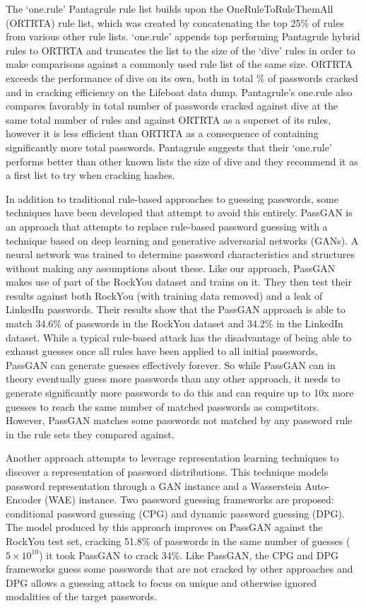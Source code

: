 \documentclass{article}
\begin{document}
The `one.rule' Pantagrule rule list builds upon the OneRuleToRuleThemAll
(ORTRTA) rule list\autocite{ortrta}, which was created by concatenating the top
25\% of rules from various other rule lists. `one.rule' appends top performing
Pantagrule hybrid rules to ORTRTA and truncates the list to the size of
the `dive' rules in order to make comparisons against a commonly used rule list
of the same size. ORTRTA exceeds the performance of dive on its own, both in
total \% of passwords cracked and in cracking efficiency on the Lifeboat data
dump\autocite{ortrta}. Pantagrule's one.rule also compares favorably in total
number of passwords
cracked against dive at the same total number of rules and against ORTRTA as a
superset of its rules, however it is less efficient than ORTRTA as a
consequence of containing significantly more total passwords. Pantagrule
suggests that their `one.rule' performs better than other known lists the size
of dive and they recommend it as a first list to try when cracking hashes.


In addition to traditional rule-based approaches to guessing passwords, some
techniques have been developed that attempt to avoid this entirely.
PassGAN\autocite{hitaj2019passgan} is an approach that attempts to replace
rule-based password guessing with a technique based on deep learning and
generative adversarial networks (GANs). A neural network was
trained to determine password characteristics and structures without making any
assumptions about these. Like our approach, PassGAN makes use of part of the
RockYou dataset and trains on it. They then test their results against both
RockYou (with training data removed) and a leak of LinkedIn passwords. Their
results show that the PassGAN approach is able to match 34.6\% of passwords in
the RockYou dataset and 34.2\% in the LinkedIn dataset. While a typical
rule-based attack has the disadvantage of being able to exhaust guesses once
all rules have been applied to all initial passwords, PassGAN can generate
guesses effectively forever. So while PassGAN can in theory eventually guess
more passwords than any other approach, it needs to generate significantly more
passwords to do this and can require up to 10x more guesses to reach the same
number of matched passwords as competitors. However, PassGAN matches some
passwords
not matched by any password rule in the rule sets they compared against.

Another approach\autocite{pasquini2021improving} attempts to leverage
representation learning techniques to discover a representation of password
distributions. This technique models password representation through a GAN
instance and a Wasserstein Auto-Encoder (WAE) instance. Two password guessing
frameworks are proposed: conditional password guessing (CPG) and dynamic
password guessing (DPG). The model produced by this approach
improves on PassGAN against the RockYou test set, cracking 51.8\% of passwords
in the same number of guesses ($5 \times 10^{10}$) it took PassGAN to crack 34\%.
Like PassGAN, the CPG and DPG frameworks guess some passwords that are not
cracked by other approaches and DPG allows a guessing attack to focus on unique
and otherwise ignored modalities of the target passwords.
\end{document}
